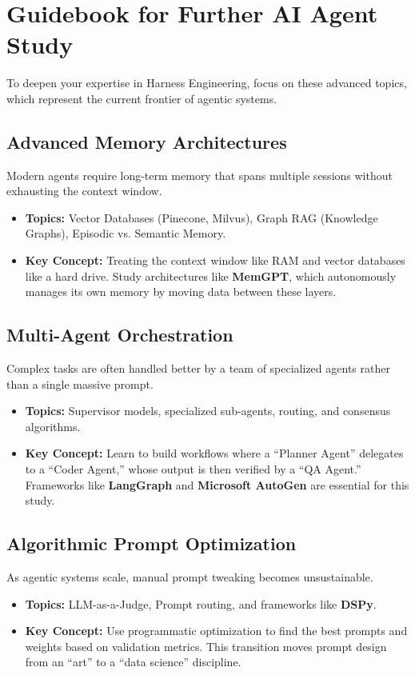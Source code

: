 \chapter{Guidebook for Further AI Agent Study}

To deepen your expertise in Harness Engineering, focus on these advanced topics, which represent the current frontier of agentic systems.

\section{Advanced Memory Architectures}
Modern agents require long-term memory that spans multiple sessions without exhausting the context window.
\begin{itemize}
    \item \textbf{Topics:} Vector Databases (Pinecone, Milvus), Graph RAG (Knowledge Graphs), Episodic vs. Semantic Memory.
    \item \textbf{Key Concept:} Treating the context window like RAM and vector databases like a hard drive. Study architectures like \textbf{MemGPT}, which autonomously manages its own memory by moving data between these layers.
\end{itemize}

\section{Multi-Agent Orchestration}
Complex tasks are often handled better by a team of specialized agents rather than a single massive prompt.
\begin{itemize}
    \item \textbf{Topics:} Supervisor models, specialized sub-agents, routing, and consensus algorithms.
    \item \textbf{Key Concept:} Learn to build workflows where a ``Planner Agent'' delegates to a ``Coder Agent,'' whose output is then verified by a ``QA Agent.'' Frameworks like \textbf{LangGraph} and \textbf{Microsoft AutoGen} are essential for this study.
\end{itemize}

\section{Algorithmic Prompt Optimization}
As agentic systems scale, manual prompt tweaking becomes unsustainable.
\begin{itemize}
    \item \textbf{Topics:} LLM-as-a-Judge, Prompt routing, and frameworks like \textbf{DSPy}.
    \item \textbf{Key Concept:} Use programmatic optimization to find the best prompts and weights based on validation metrics. This transition moves prompt design from an ``art'' to a ``data science'' discipline.
\end{itemize}

